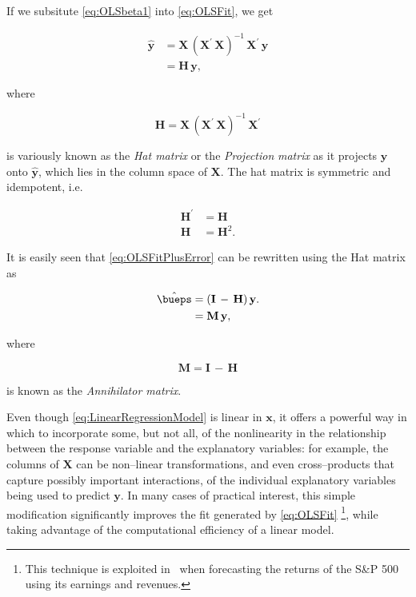 \documentclass[graybox,envcountchap,sectrefs]{svmono}\usepackage[]{graphicx}\usepackage[]{xcolor}
\begin{document}
\begin{appendices}
If we subsitute \eqref{eq:OLSbeta1} into \eqref{eq:OLSFit}, we get

\begin{align}
\hat{\mathrm{\mathbf{y}}} & =\mathbf{X}\,\left(\mathrm{\mathbf{X}}^{\prime}\,\mathrm{\mathbf{X}}\right)^{-1}\,\mathrm{\mathbf{X}}^{\prime}\,\mathrm{\mathbf{y}}\nonumber \\
 & =\mathbf{H}\,\mathrm{\mathbf{y}},\label{eq:HatMatrix1}
\end{align}

where 

\begin{equation}
\mathbf{H}=\mathbf{X}\,\left(\mathrm{\mathbf{X}}^{\prime}\,\mathrm{\mathbf{X}}\right)^{-1}\,\mathrm{\mathbf{X}}^{\prime}\label{eq:HatMatrix2}
\end{equation}

is variously known as the \emph{Hat matrix} or the \emph{Projection}
\emph{matrix} as it projects $\mathbf{y}$ onto $\hat{\mathrm{\mathbf{y}}}$,
which lies in the column space of $\mathbf{X}$. The hat matrix is
symmetric and idempotent, i.e.

\begin{subequations}
\begin{align}
\mathbf{H}^{\prime} & =\mathbf{H}\label{eq:HatMatrix3}\\[0.5em]
\mathrm{\mathbf{H}} & =\mathrm{\mathbf{H}}^{2}.\label{eq:HatMatrix4}
\end{align}
\end{subequations}

It is easily seen that \eqref{eq:OLSFitPlusError} can be rewritten
using the Hat matrix as

\begin{align}
\hat{\bueps} & =\left(\mathbf{I}\,-\,\mathbf{H}\right)\mathbf{y}.\nonumber \\
 & =\mathbf{M}\,\mathbf{y},\label{eq:AnhillatorMatrix1}
\end{align}

where

\begin{equation}
\mathbf{M}=\mathbf{I}\,-\,\mathbf{H}\label{eq:AnhillatorMatrix2}
\end{equation}

is known as the \emph{Annihilator matrix}.

Even though \eqref{eq:LinearRegressionModel} is linear in $\mathbf{x}$,
it offers a powerful way in which to incorporate some, but not all,
of the nonlinearity in the relationship between the response variable
and the explanatory variables: for example, the columns of $\mathbf{X}$
can be non--linear transformations, and even cross--products that
capture possibly important interactions, of the individual explanatory
variables being used to predict $\mathrm{\mathbf{y}}$. In many cases
of practical interest, this simple modification significantly improves
the fit generated by \eqref{eq:OLSFit} \footnote{This technique is exploited in \ExpectedReturnChapter\  when forecasting
the returns of the S\&P 500 using its earnings and revenues.}, while taking advantage of the computational efficiency of a linear
model.


\end{appendices}
\end{document}
